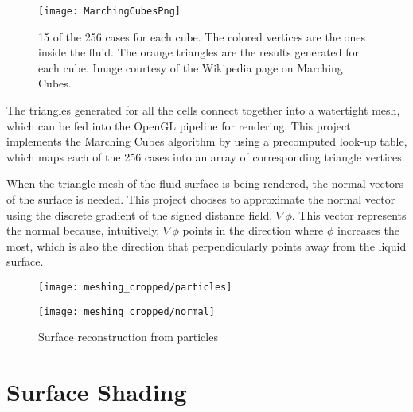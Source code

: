 \begin{figure}[H]
    \centering
    \texttt{[image: MarchingCubesPng]}
    \caption{15 of the 256 cases for each cube. The colored vertices are the ones inside the fluid. The orange triangles are the results generated for each cube. Image courtesy of the Wikipedia page on Marching Cubes. }
    \label{figure marching cubes}
\end{figure}

The triangles generated for all the cells connect together into a watertight mesh, which can be fed into the OpenGL pipeline for rendering. This project implements the Marching Cubes algorithm by using a precomputed look-up table, which maps each of the 256 cases into an array of corresponding triangle vertices.

When the triangle mesh of the fluid surface is being rendered, the normal vectors of the surface is needed. This project chooses to approximate the normal vector using the discrete gradient of the signed distance field, $\nabla \phi$. This vector represents the normal because, intuitively, $\nabla \phi$ points in the direction where $\phi$ increases the most, which is also the direction that perpendicularly points away from the liquid surface.



\begin{figure}[H]
    \centering
    
    \begin{minipage}[t]{.49\linewidth}
        \centering
        \vspace{0pt}
        \texttt{[image: meshing\_cropped/particles]}
    \end{minipage}
    \begin{minipage}[t]{.49\linewidth}
        \centering
        \vspace{0pt}
        \texttt{[image: meshing\_cropped/normal]}
    \end{minipage}
    
    \caption{Surface reconstruction from particles}
    \label{figure surface reconstruction}
\end{figure}




\section{Surface Shading}

